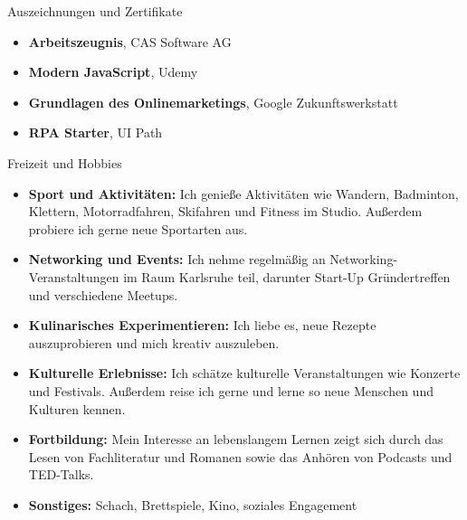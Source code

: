 \documentclass{resume} %
\begin{document}
\begin{rSection}{Auszeichnungen und Zertifikate}
    \vspace{0.5em}

    \begin{itemize}
        \item \textbf{Arbeitszeugnis}, CAS Software AG
        \item \textbf{Modern JavaScript}, Udemy
        \item \textbf{Grundlagen des Onlinemarketings}, Google Zukunftswerkstatt
        \item \textbf{RPA Starter}, UI Path
    \end{itemize}


\end{rSection}

\begin{rSection}{Freizeit und Hobbies}
    \vspace{0.5em}
    \begin{itemize}
        \item \raggedright{\textbf{Sport und Aktivitäten:} Ich genieße Aktivitäten wie Wandern, Badminton, Klettern, Motorradfahren, Skifahren und Fitness im Studio. Außerdem probiere ich gerne neue Sportarten aus.}
        \item \raggedright{\textbf{Networking und Events:} Ich nehme regelmäßig an Networking-Veranstaltungen im Raum Karlsruhe teil, darunter Start-Up Gründertreffen und verschiedene Meetups.}
        \item \raggedright{\textbf{Kulinarisches Experimentieren:} Ich liebe es, neue Rezepte auszuprobieren und mich kreativ auszuleben.} 
        \item \raggedright{\textbf{Kulturelle Erlebnisse:} Ich schätze kulturelle Veranstaltungen wie Konzerte und Festivals. Außerdem reise ich gerne und lerne so neue Menschen und Kulturen kennen.}
        \item \raggedright{\textbf{Fortbildung:} Mein Interesse an lebenslangem Lernen zeigt sich durch das Lesen von Fachliteratur und Romanen sowie das Anhören von Podcasts und TED-Talks.}
        \item \raggedright{\textbf{Sonstiges:} Schach, Brettspiele, Kino, soziales Engagement}
    \end{itemize}


\end{rSection}
\end{document}
